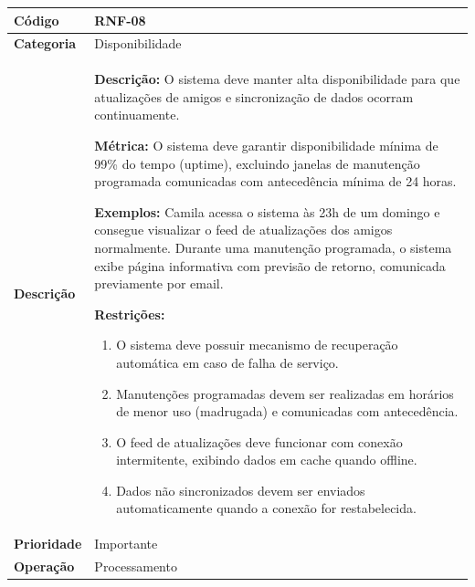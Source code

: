 \FloatBarrier
\begin{quadro}[h!]
\caption{RNF-08 -- Disponibilidade do Sistema}
\label{quad:rnf08}
\begin{tabular}{|p{3.2cm}|p{11.8cm}|}
\hline
\textbf{Código}     & RNF-08 \\ \hline
\textbf{Categoria}  & Disponibilidade \\ \hline
\textbf{Descrição}  &
\textbf{Descrição:} O sistema deve manter alta disponibilidade para que atualizações de amigos e sincronização de dados ocorram continuamente.

\textbf{Métrica:} O sistema deve garantir disponibilidade mínima de 99\% do tempo (uptime), excluindo janelas de manutenção programada comunicadas com antecedência mínima de 24 horas.

\textbf{Exemplos:} Camila acessa o sistema às 23h de um domingo e consegue visualizar o feed de atualizações dos amigos normalmente.
Durante uma manutenção programada, o sistema exibe página informativa com previsão de retorno, comunicada previamente por email.

\textbf{Restrições:}
\begin{enumerate}[nosep,leftmargin=1.2em,topsep=2pt,partopsep=0pt,parsep=0pt,itemsep=1pt]
  \item O sistema deve possuir mecanismo de recuperação automática em caso de falha de serviço.
  \item Manutenções programadas devem ser realizadas em horários de menor uso (madrugada) e comunicadas com antecedência.
  \item O feed de atualizações deve funcionar com conexão intermitente, exibindo dados em cache quando offline.
  \item Dados não sincronizados devem ser enviados automaticamente quando a conexão for restabelecida.
\end{enumerate} \\ \hline
\textbf{Prioridade} & Importante \\ \hline
\textbf{Operação}   & Processamento \\ \hline
\end{tabular}
\end{quadro}


